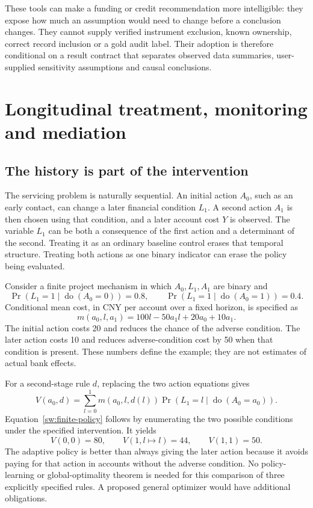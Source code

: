 These tools can make a funding or credit recommendation more intelligible:
they expose how much an assumption would need to change before a conclusion
changes. They cannot supply verified instrument exclusion, known ownership,
correct record inclusion or a gold audit label. Their adoption is therefore
conditional on a result contract that separates observed data summaries,
user-supplied sensitivity assumptions and causal conclusions.

\chapter{Longitudinal treatment, monitoring and mediation}
\label{sw:longitudinal}

\section{The history is part of the intervention}

The servicing problem is naturally sequential. An initial action \(A_0\), such
as an early contact, can change a later financial condition \(L_1\). A second
action \(A_1\) is then chosen using that condition, and a later account cost
\(Y\) is observed. The variable \(L_1\) can be both a consequence of the first
action and a determinant of the second. Treating it as an ordinary baseline
control erases that temporal structure. Treating both actions as one binary
indicator can erase the policy being evaluated.

Consider a finite project mechanism in which \(A_0,L_1,A_1\) are binary and
\[
 \Pr(L_1=1\mid\operatorname{do}(A_0=0))=0.8,
 \qquad
 \Pr(L_1=1\mid\operatorname{do}(A_0=1))=0.4.
\]
Conditional mean cost, in CNY per account over a fixed horizon, is specified as
\[
 m(a_0,l,a_1)=100l-50a_1l+20a_0+10a_1.
\]
The initial action costs 20 and reduces the chance of the adverse condition.
The later action costs 10 and reduces adverse-condition cost by 50 when that
condition is present. These numbers define the example; they are not estimates
of actual bank effects.

For a second-stage rule \(d\), replacing the two action equations gives
\begin{equation}
 V(a_0,d)=\sum_{l=0}^{1}m(a_0,l,d(l))
             \Pr(L_1=l\mid\operatorname{do}(A_0=a_0)).
 \label{sw:finite-policy}
\end{equation}
Equation~\eqref{sw:finite-policy} follows by enumerating the two possible
conditions under the specified intervention. It yields
\[
 V(0,0)=80,\qquad V(1,l\mapsto l)=44,\qquad V(1,1)=50.
\]
The adaptive policy is better than always giving the later action because it
avoids paying for that action in accounts without the adverse condition.
No policy-learning or global-optimality theorem is needed for this comparison
of three explicitly specified rules. A proposed general optimizer would have
additional obligations.

